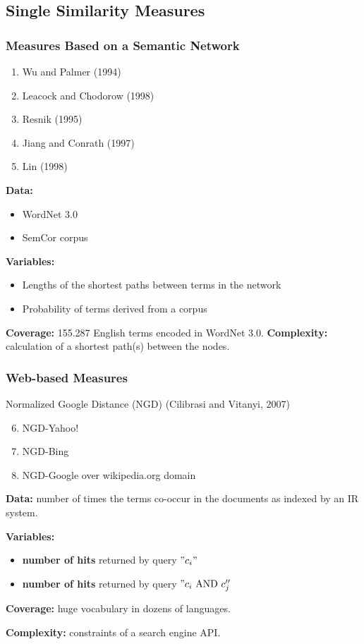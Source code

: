 \documentclass{beamer}
\begin{document}
\subsection{Single Similarity Measures}

\begin{frame}
\frametitle{Measures Based on a Semantic Network}

\begin{enumerate}
  \item Wu and Palmer (1994)
 \item Leacock and Chodorow (1998)
 \item Resnik (1995)
 \item Jiang and Conrath (1997)
 \item Lin (1998)
\end{enumerate}


 \textbf{Data:} 
 \begin{itemize}
   \item WordNet 3.0
   \item SemCor corpus
	
 \end{itemize}
 \textbf{Variables:}
 \begin{itemize}
  \item Lengths of the shortest paths between terms in the network
 \item Probability of terms derived from a corpus
 \end{itemize}
 
 \textbf{Coverage:} 155.287 English terms encoded in WordNet 3.0.
 \textbf{Complexity:} calculation of a shortest path(s) between the nodes.

\end{frame}

\begin{frame}
\frametitle{Web-based Measures}
	
Normalized Google Distance (NGD) (Cilibrasi and Vitanyi, 2007)

\begin{enumerate}
   \setcounter{enumi}{5}
   \item NGD-Yahoo! 
   \item NGD-Bing 
   \item NGD-Google over wikipedia.org domain     
\end{enumerate}

\textbf{Data:} number of times the terms co-occur in the documents
as indexed by an IR system.

\textbf{Variables:} 

\begin{itemize}
	\item \textbf{number of hits} returned by query $"c_i"$ 
	\item \textbf{number of hits} returned by query $"c_i \text{ AND } c_j''$
\end{itemize}

\textbf{Coverage:} huge vocabulary in dozens of languages.


\textbf{Complexity:} constraints of a search engine API.

\end{frame}
\end{document}

